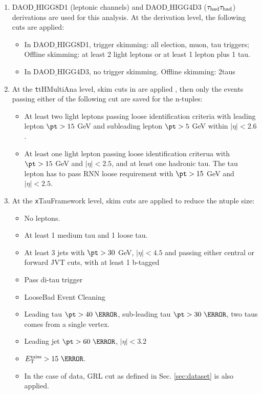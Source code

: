 \begin{enumerate}
\item DAOD$\_$HIGG8D1 (leptonic channels) and DAOD$\_$HIGG4D3 ($\tau_\text{had}{}\tau_\text{had}$) derivations are used for this analysis. At the derivation level, the following cuts are applied:
  \begin{itemize}
  \item In DAOD$\_$HIGG8D1, trigger skimming: all election, muon, tau triggers; Offline skimming: at least 2 light leptons or at least 1 lepton plus 1 tau.
  \item In DAOD$\_$HIGG4D3, no trigger skimming. Offline skimming: 2taus
  \end{itemize}
\item At the {\texttt ttHMultiAna} level, skim cuts in \cite{ATL-COM-PHYS-2018-410} are applied , then only the events passing either of the following cut are saved for the n-tuples:
  \begin{itemize}
  \item At least two light leptons passing loose identification criteria with leading lepton $\pt > 15$ GeV and subleading lepton $\pt > 5$ GeV within $|\eta|<2.6$.
  \item At least one light lepton passing loose identification criterua with $\pt >15$ GeV and $|\eta|<2.5$, and at least one hadronic tau. The tau lepton has to pass RNN loose requirement with $\pt >15$ GeV and $|\eta|<2.5$.
  \end{itemize}

\item At the {\texttt xTauFramework} level, skim cuts are applied to reduce the ntuple size:
  \begin{itemize}
  \item No leptons.
  \item At least 1 medium tau and 1 loose tau.
  \item At least 3 jets with $\pt>30$ GeV, $|\eta|<4.5$ and passing either central or forward JVT cuts, with at least 1 b-tagged
  \item Pass di-tau trigger
  \item LooseBad Event Cleaning
  \item Leading tau $\pt>40~\GeV$, sub-leading tau $\pt>30~\GeV$, two taus comes from a single vertex.
  \item Leading jet $\pt>60~\GeV$, $|\eta|<3.2$
  \item $\met>15~\GeV$.
  \item In the case of data, GRL cut as defined in Sec. \ref{sec:dataset} is also applied.
  \end{itemize}


\end{enumerate}
